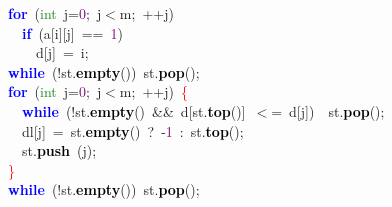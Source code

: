 {{\mbox{}\ \ \textbf{\textcolor{Blue}{for}}\ \textcolor{BrickRed}{(}\textcolor{ForestGreen}{int}\ j\textcolor{BrickRed}{=}\textcolor{Purple}{0}\textcolor{BrickRed}{;}\ j\textcolor{BrickRed}{$<$}m\textcolor{BrickRed}{;}\ \textcolor{BrickRed}{++}j\textcolor{BrickRed}{)} \\
\mbox{}\ \ \ \ \textbf{\textcolor{Blue}{if}}\ \textcolor{BrickRed}{(}a\textcolor{BrickRed}{[}i\textcolor{BrickRed}{][}j\textcolor{BrickRed}{]}\ \textcolor{BrickRed}{==}\ \textcolor{Purple}{1}\textcolor{BrickRed}{)} \\
\mbox{}\ \ \ \ \ \ d\textcolor{BrickRed}{[}j\textcolor{BrickRed}{]}\ \textcolor{BrickRed}{=}\ i\textcolor{BrickRed}{;} \\
\mbox{}\ \ \textbf{\textcolor{Blue}{while}}\ \textcolor{BrickRed}{(!}st\textcolor{BrickRed}{.}\textbf{\textcolor{Black}{empty}}\textcolor{BrickRed}{())}\ st\textcolor{BrickRed}{.}\textbf{\textcolor{Black}{pop}}\textcolor{BrickRed}{();} \\
\mbox{}\ \ \textbf{\textcolor{Blue}{for}}\ \textcolor{BrickRed}{(}\textcolor{ForestGreen}{int}\ j\textcolor{BrickRed}{=}\textcolor{Purple}{0}\textcolor{BrickRed}{;}\ j\textcolor{BrickRed}{$<$}m\textcolor{BrickRed}{;}\ \textcolor{BrickRed}{++}j\textcolor{BrickRed}{)}\ \textcolor{Red}{\{} \\
\mbox{}\ \ \ \ \textbf{\textcolor{Blue}{while}}\ \textcolor{BrickRed}{(!}st\textcolor{BrickRed}{.}\textbf{\textcolor{Black}{empty}}\textcolor{BrickRed}{()}\ \textcolor{BrickRed}{\&\&}\ d\textcolor{BrickRed}{[}st\textcolor{BrickRed}{.}\textbf{\textcolor{Black}{top}}\textcolor{BrickRed}{()]}\ \textcolor{BrickRed}{$<$=}\ d\textcolor{BrickRed}{[}j\textcolor{BrickRed}{])}\ \ st\textcolor{BrickRed}{.}\textbf{\textcolor{Black}{pop}}\textcolor{BrickRed}{();} \\
\mbox{}\ \ \ \ dl\textcolor{BrickRed}{[}j\textcolor{BrickRed}{]}\ \textcolor{BrickRed}{=}\ st\textcolor{BrickRed}{.}\textbf{\textcolor{Black}{empty}}\textcolor{BrickRed}{()}\ \textcolor{BrickRed}{?}\ \textcolor{BrickRed}{-}\textcolor{Purple}{1}\ \textcolor{BrickRed}{:}\ st\textcolor{BrickRed}{.}\textbf{\textcolor{Black}{top}}\textcolor{BrickRed}{();} \\
\mbox{}\ \ \ \ st\textcolor{BrickRed}{.}\textbf{\textcolor{Black}{push}}\ \textcolor{BrickRed}{(}j\textcolor{BrickRed}{);} \\
\mbox{}\ \ \textcolor{Red}{\}} \\
\mbox{}\ \ \textbf{\textcolor{Blue}{while}}\ \textcolor{BrickRed}{(!}st\textcolor{BrickRed}{.}\textbf{\textcolor{Black}{empty}}\textcolor{BrickRed}{())}\ st\textcolor{BrickRed}{.}\textbf{\textcolor{Black}{pop}}\textcolor{BrickRed}{();} \\
}}
